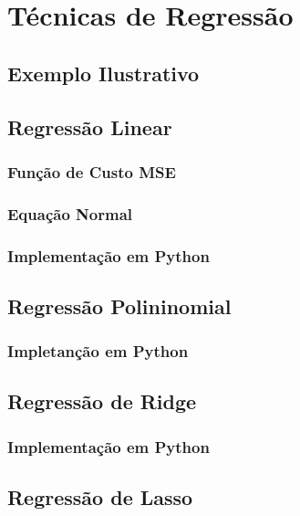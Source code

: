 
\chapter{Técnicas de Regressão}
\label{cap:regressao}

\section{Exemplo Ilustrativo}

\section{Regressão Linear}

\subsection{Função de Custo MSE}

\subsection{Equação Normal}

\subsection{Implementação em Python}

\section{Regressão Polininomial}

\subsection{Impletanção em Python}

\section{Regressão de Ridge}

\subsection{Implementação em Python}

\section{Regressão de Lasso}

